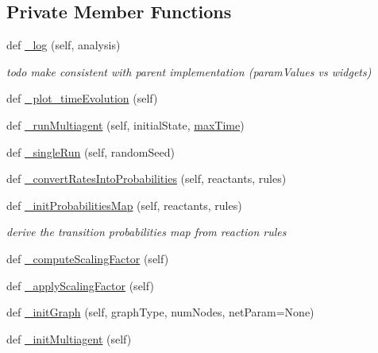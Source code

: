 \subsection*{Private Member Functions}
\begin{DoxyCompactItemize}
\item 
def \hyperlink{class_mu_mo_t_1_1_mu_mo_tmultiagent_view_a8b4ffd0e4999bd45c6ca33fe0f40d1e3}{\+\_\+log} (self, analysis)
\begin{DoxyCompactList}\small\item\em todo make consistent with parent implementation (param\+Values vs widgets) \end{DoxyCompactList}\item 
def \hyperlink{class_mu_mo_t_1_1_mu_mo_tmultiagent_view_ace35072dcd3e51e67107f62b4de0d5fe}{\+\_\+plot\+\_\+time\+Evolution} (self)
\item 
def \hyperlink{class_mu_mo_t_1_1_mu_mo_tmultiagent_view_a2aeccd8cc467046f91ce45a4faef700b}{\+\_\+run\+Multiagent} (self, initial\+State, \hyperlink{class_mu_mo_t_1_1_mu_mo_tview_aa820f7e11b025b06f4eeb0ad7581ad34}{max\+Time})
\item 
def \hyperlink{class_mu_mo_t_1_1_mu_mo_tmultiagent_view_a51d421aacb4cd83af5f1c2e60c3dff9c}{\+\_\+single\+Run} (self, random\+Seed)
\item 
def \hyperlink{class_mu_mo_t_1_1_mu_mo_tmultiagent_view_a63242960a1d4db3a17cc8657a8ee7da1}{\+\_\+convert\+Rates\+Into\+Probabilities} (self, reactants, rules)
\item 
def \hyperlink{class_mu_mo_t_1_1_mu_mo_tmultiagent_view_ad360a89687fc9a0298c853d76b8b8d95}{\+\_\+init\+Probabilities\+Map} (self, reactants, rules)
\begin{DoxyCompactList}\small\item\em derive the transition probabilities map from reaction rules \end{DoxyCompactList}\item 
def \hyperlink{class_mu_mo_t_1_1_mu_mo_tmultiagent_view_a064b5783c9e87092a7059fb632b56585}{\+\_\+compute\+Scaling\+Factor} (self)
\item 
def \hyperlink{class_mu_mo_t_1_1_mu_mo_tmultiagent_view_acc41eb1ddfc93fea7e67aa85c9d7f6fc}{\+\_\+apply\+Scaling\+Factor} (self)
\item 
def \hyperlink{class_mu_mo_t_1_1_mu_mo_tmultiagent_view_a0d226d5fb0e02291c96e1ff63a08047e}{\+\_\+init\+Graph} (self, graph\+Type, num\+Nodes, net\+Param=None)
\item 
def \hyperlink{class_mu_mo_t_1_1_mu_mo_tmultiagent_view_a4b9b689b183e0a18c7f60e48b6beafef}{\+\_\+init\+Multiagent} (self)

\end{DoxyCompactItemize}
